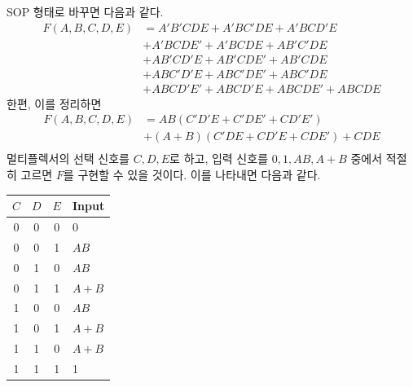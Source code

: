 \documentclass{scrartcl}
\begin{document}
SOP 형태로 바꾸면 다음과 같다.
\begin{align*}
  F(A, B, C, D, E) &= A' B' C D E + A' B C' D E + A' B C D' E \\
                   &+ A' B C D E' + A' B C D E + A B' C' D E \\
                   &+ A B' C D' E + A B' C D E' + A B' C D E \\
                   &+ A B C' D' E + A B C' D E' + A B C' D E \\
                   &+ A B C D' E' + A B C D' E + A B C D E' + A B C D E
\end{align*}
한편, 이를 정리하면
\begin{align*}
  F(A, B, C, D, E) &= AB (C' D' E + C' D E' + C D' E') \\
                   &+ (A + B)(C' D E + C D' E + C D E') + CDE \\
\end{align*}
멀티플렉서의 선택 신호를 \(C, D, E\)로 하고, 입력 신호를 \(0, 1, AB, A + B\) 중에서 적절히 고르면 \(F\)를 구현할 수 있을 것이다.
이를 나타내면 다음과 같다.
\begin{table}[H]
  \centering
  \begin{tabular}{|ccc|l|}
  \hline
  \(C\) & \(D\) & \(E\) & Input \\
  \hline
  0 & 0 & 0 & 0 \\
  0 & 0 & 1 & \(AB\) \\
  0 & 1 & 0 & \(AB\) \\
  0 & 1 & 1 & \(A + B\) \\
  1 & 0 & 0 & \(AB\) \\
  1 & 0 & 1 & \(A + B\) \\
  1 & 1 & 0 & \(A + B\) \\
  1 & 1 & 1 & 1 \\
  \hline
  \end{tabular}
\end{table}
\end{document}
